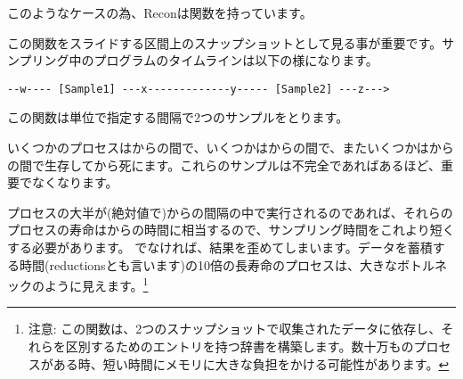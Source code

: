 このようなケースの為、Reconは関数を持っています。

この関数をスライドする区間上のスナップショットとして見る事が重要です。サンプリング中のプログラムのタイムラインは以下の様になります。

\begin{Verbatim}
--w---- [Sample1] ---x-------------y----- [Sample2] ---z--->
\end{Verbatim}

この関数は単位で指定する間隔で2つのサンプルをとります。

いくつかのプロセスはからの間で、いくつかはからの間で、またいくつかはからの間で生存してから死にます。これらのサンプルは不完全であればあるほど、重要でなくなります。

プロセスの大半が(絶対値で)からの間隔の中で実行されるのであれば、それらのプロセスの寿命はからの時間に相当するので、サンプリング時間をこれより短くする必要があります。
でなければ、結果を歪めてしまいます。データを蓄積する時間(reductionsとも言います)の10倍の長寿命のプロセスは、大きなボトルネックのように見えます。\footnote{注意: この関数は、2つのスナップショットで収集されたデータに依存し、それらを区別するためのエントリを持つ辞書を構築します。数十万ものプロセスがある時、短い時間にメモリに大きな負担をかける可能性があります。}

